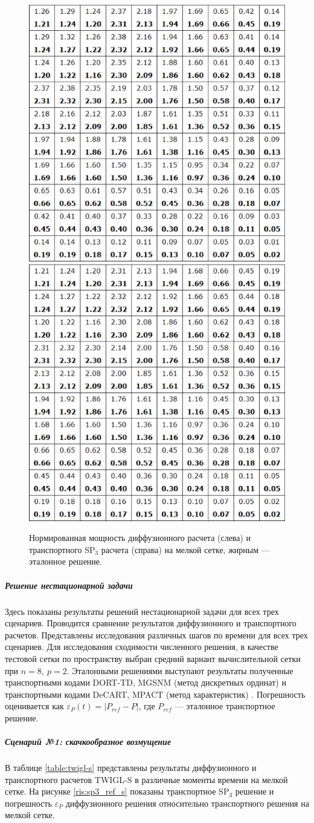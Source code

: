 \documentclass{crm-article}
\begin{document}
\begin{figure}[ht]
\begin{center}
	\includegraphics[width=0.4\linewidth]{dif_pwr.eps} \hspace{20pt}
	\includegraphics[width=0.4\linewidth]{sp3_pwr.eps}\\
	\caption{\label{image:canonsummary} Нормированная мощность диффузионного расчета (слева) и транспортного SP$_3$ расчета (справа) на мелкой сетке, жирным --- эталонное решение.}
	\label{ris:int_pwr}
\end{center}
\end{figure}

\subparagraph{Решение нестационарной задачи}
Здесь показаны результаты решений нестационарной задачи для всех трех сценариев.
Проводится сравнение результатов диффузионного и транспортного расчетов.
Представлены исследования различных шагов по времени для всех трех сценариев.  
Для исследования сходимости численного решения, в качестве тестовой сетки  по пространству выбран средний вариант вычислительной сетки при $n=8,\ p=2$.
Эталонными решениями выступают результаты полученные транспортными кодами DORT-TD, MGSNM (метод дискретных ординат) и транспортными кодами DeCART, MPACT (метод характеристик) \cite{kondrushin2014}.
Погрешность оценивается как $\varepsilon_P(t) = | P_{ref} - P |$, где $P_{ref}$ --- эталонное транспортное решение.

\subparagraph{Сценарий №1: скачкообразное возмущение}
В таблице \ref{table:twigl-s} представлены результаты диффузионного и транспортного расчетов TWIGL-S в различные моменты времени на мелкой сетке.
На рисунке \ref{ris:sp3_ref_s} показаны транспортное SP$_3$ решение и погрешность $\varepsilon_P$ диффузионного решения относительно транспортного решения на мелкой сетке. 
\end{document}
